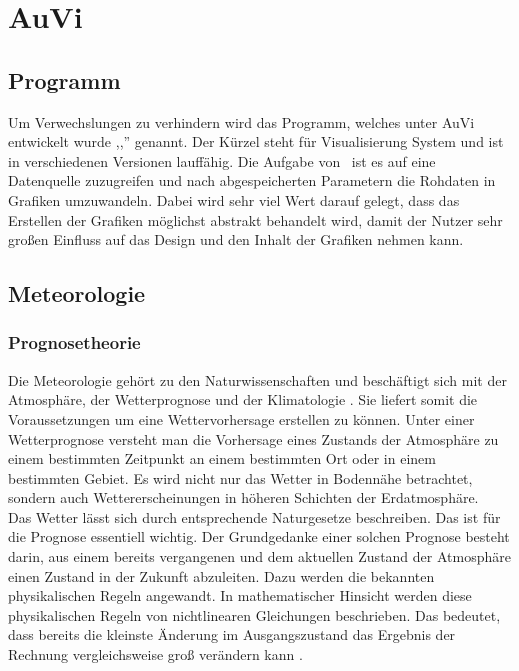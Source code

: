 \section{AuVi}

\subsection{Programm} %
Um Verwechslungen zu verhindern wird das Programm,
welches unter AuVi entwickelt wurde ,,\vs '' genannt.
Der Kürzel steht für Visualisierung System und ist in verschiedenen Versionen lauffähig.
Die Aufgabe von \vs\ ist es auf eine Datenquelle zuzugreifen
und nach abgespeicherten Parametern die Rohdaten in Grafiken umzuwandeln.
Dabei wird sehr viel Wert darauf gelegt,
dass das Erstellen der Grafiken möglichst abstrakt behandelt wird,
damit der Nutzer sehr großen Einfluss auf das Design und den Inhalt der Grafiken nehmen kann.

\subsection{Meteorologie} %

\subsubsection{Prognosetheorie} %
Die Meteorologie gehört zu den Naturwissenschaften und
beschäftigt sich mit der Atmosphäre, der Wetterprognose und der Klimatologie \cite{meteorologie}.
Sie liefert somit die Voraussetzungen um eine Wettervorhersage erstellen zu können.
Unter einer Wetterprognose versteht man die Vorhersage eines Zustands
der Atmosphäre zu einem bestimmten Zeitpunkt an einem bestimmten Ort
oder in einem bestimmten Gebiet.
Es wird nicht nur das Wetter in Bodennähe betrachtet,
sondern auch Wettererscheinungen in höheren Schichten der Erdatmosphäre.
\\
Das Wetter lässt sich durch entsprechende Naturgesetze beschreiben.
Das ist für die Prognose essentiell wichtig.
Der Grundgedanke einer solchen Prognose besteht darin,
aus einem bereits vergangenen und dem aktuellen Zustand
der Atmosphäre einen Zustand in der Zukunft abzuleiten.
Dazu werden die bekannten physikalischen Regeln angewandt.
In mathematischer Hinsicht werden diese physikalischen Regeln von
nichtlinearen Gleichungen beschrieben.
Das bedeutet, dass bereits die kleinste Änderung im Ausgangszustand
das Ergebnis der Rechnung vergleichsweise groß verändern kann \cite{nonlinear}.


